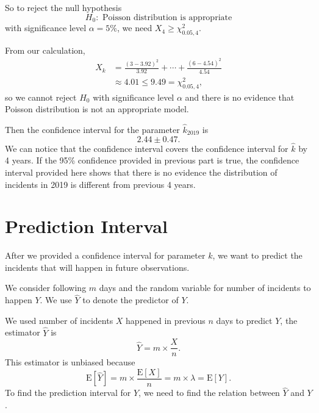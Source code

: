 \documentclass[11pt,a4paper,english]{article}
\begin{document}
So to reject the null hypothesis 
\begin{equation*}
	H_{0}:\text{ Poisson distribution is appropriate}
\end{equation*}
with significance level $\alpha = 5\%$, we need $X_{4} \geq \chi^{2}_{0.05,4}$.

From our calculation,
\begin{align*}
	X_{k} &= \frac{(3-3.92)^{2}}{3.92}+\cdots+\frac{(6-4.54)^{2}}{4.54}\\
	&\approx 4.01 \leq 9.49  = \chi^{2}_{0.05,4},
\end{align*}
so we cannot reject $H_{0}$ with significance level $\alpha$ and there is no evidence that Poisson distribution is not an appropriate model.

Then the confidence interval for the parameter $\hat{k}_{2019}$ is 
\begin{equation*}
	2.44 \pm 0.47.
\end{equation*}
We can notice that the confidence interval covers the confidence interval for $\hat{k}$ by 4 years. If the 95\% confidence provided in previous part is true, the confidence interval provided here shows that there is no evidence the distribution of incidents in 2019 is different from previous 4 years. 
\section{Prediction Interval}
After we provided a confidence interval for parameter $k$, we want to predict the incidents that will happen in future observations.

We consider following $m$ days and the random variable for number of incidents to happen $Y$. We use $\hat{Y}$ to denote the predictor of $Y$.

We used number of incidents $X$ happened in previous $n$ days to predict $Y$, the estimator $\hat{Y}$ is 
\begin{equation*}
\hat{Y} = m \times \frac{X}{n}.
\end{equation*}
This estimator is unbiased because 
\begin{equation*}
	\text{E}[\hat{Y}] = m \times \frac{\text{E}[X]}{n} = m \times \lambda = \text{E}[Y].
\end{equation*}
To find the prediction interval for $Y$, we need to find the relation between $\hat{Y}$ and $Y$.
\end{document}
